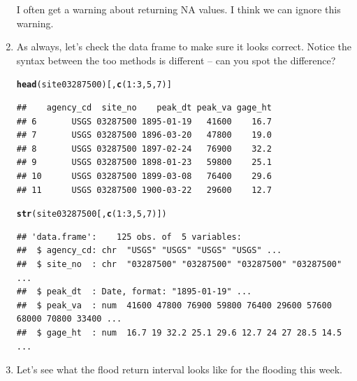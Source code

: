 \documentclass{tufte-handout}\usepackage[]{graphicx}\usepackage[]{xcolor}
\makeatletter
\newcommand{\hlnum}[1]{\textcolor[rgb]{0.686,0.059,0.569}{#1}}%
\newcommand{\hlopt}[1]{\textcolor[rgb]{0,0,0}{#1}}%
\newcommand{\hlstd}[1]{\textcolor[rgb]{0.345,0.345,0.345}{#1}}%
\newcommand{\hlkwd}[1]{\textcolor[rgb]{0.737,0.353,0.396}{\textbf{#1}}}%
\newenvironment{kframe}{%
 \def\at@end@of@kframe{}%
 \ifinner\ifhmode%
  \def\at@end@of@kframe{\end{minipage}}%
  \begin{minipage}{\columnwidth}%
 \fi\fi%
 \def\FrameCommand##1{\hskip\@totalleftmargin \hskip-\fboxsep
 \colorbox{shadecolor}{##1}\hskip-\fboxsep
     \hskip-\linewidth \hskip-\@totalleftmargin \hskip\columnwidth}%
 \MakeFramed {\advance\hsize-\width
   \@totalleftmargin\z@ \linewidth\hsize
   \@setminipage}}%
 {\par\unskip\endMakeFramed%
 \at@end@of@kframe}
\newenvironment{knitrout}{}{} %
\makeatother
\begin{document}
\begin{enumerate}
I often get a warning about returning NA values. I think we can ignore this warning.

  \item As always, let's check the data frame to make sure it looks correct. Notice the
syntax between the too methods is different -- can you spot the difference?

\begin{knitrout}
\color{fgcolor}\begin{kframe}
\begin{alltt}
\hlkwd{head}\hlstd{(site03287500)[,}\hlkwd{c}\hlstd{(}\hlnum{1}\hlopt{:}\hlnum{3}\hlstd{,}\hlnum{5}\hlstd{,}\hlnum{7}\hlstd{)]}
\end{alltt}
\begin{verbatim}
##    agency_cd  site_no    peak_dt peak_va gage_ht
## 6       USGS 03287500 1895-01-19   41600    16.7
## 7       USGS 03287500 1896-03-20   47800    19.0
## 8       USGS 03287500 1897-02-24   76900    32.2
## 9       USGS 03287500 1898-01-23   59800    25.1
## 10      USGS 03287500 1899-03-08   76400    29.6
## 11      USGS 03287500 1900-03-22   29600    12.7
\end{verbatim}
\begin{alltt}
\hlkwd{str}\hlstd{(site03287500[,}\hlkwd{c}\hlstd{(}\hlnum{1}\hlopt{:}\hlnum{3}\hlstd{,}\hlnum{5}\hlstd{,}\hlnum{7}\hlstd{)])}
\end{alltt}
\begin{verbatim}
## 'data.frame':	125 obs. of  5 variables:
##  $ agency_cd: chr  "USGS" "USGS" "USGS" "USGS" ...
##  $ site_no  : chr  "03287500" "03287500" "03287500" "03287500" ...
##  $ peak_dt  : Date, format: "1895-01-19" ...
##  $ peak_va  : num  41600 47800 76900 59800 76400 29600 57600 68000 70800 33400 ...
##  $ gage_ht  : num  16.7 19 32.2 25.1 29.6 12.7 24 27 28.5 14.5 ...
\end{verbatim}
\end{kframe}
\end{knitrout}

\item Let's see what the flood return interval looks like for the flooding this week. 


\end{enumerate}
\end{document}
